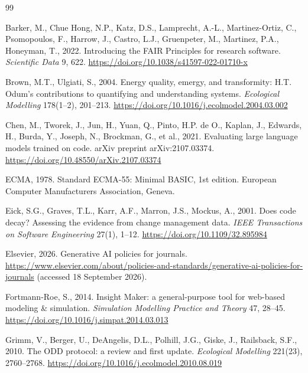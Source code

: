 \documentclass[11pt,a4paper]{article}
\begin{document}
\begin{thebibliography}{99}

Barker, M., Chue Hong, N.P., Katz, D.S., Lamprecht, A.-L., Martinez-Ortiz, C., Psomopoulos, F., Harrow, J., Castro, L.J., Gruenpeter, M., Martinez, P.A., Honeyman, T., 2022. Introducing the FAIR Principles for research software. \emph{Scientific Data} 9, 622. \url{https://doi.org/10.1038/s41597-022-01710-x}

Brown, M.T., Ulgiati, S., 2004. Energy quality, emergy, and transformity: H.T. Odum's contributions to quantifying and understanding systems. \emph{Ecological Modelling} 178(1--2), 201--213. \url{https://doi.org/10.1016/j.ecolmodel.2004.03.002}

Chen, M., Tworek, J., Jun, H., Yuan, Q., Pinto, H.P. de O., Kaplan, J., Edwards, H., Burda, Y., Joseph, N., Brockman, G., et al., 2021. Evaluating large language models trained on code. arXiv preprint arXiv:2107.03374. \url{https://doi.org/10.48550/arXiv.2107.03374}

ECMA, 1978. Standard ECMA-55: Minimal BASIC, 1st edition. European Computer Manufacturers Association, Geneva.

Eick, S.G., Graves, T.L., Karr, A.F., Marron, J.S., Mockus, A., 2001. Does code decay? Assessing the evidence from change management data. \emph{IEEE Transactions on Software Engineering} 27(1), 1--12. \url{https://doi.org/10.1109/32.895984}

Elsevier, 2026. Generative AI policies for journals. \url{https://www.elsevier.com/about/policies-and-standards/generative-ai-policies-for-journals} (accessed 18 September 2026).

Fortmann-Roe, S., 2014. Insight Maker: a general-purpose tool for web-based modeling \& simulation. \emph{Simulation Modelling Practice and Theory} 47, 28--45. \url{https://doi.org/10.1016/j.simpat.2014.03.013}

Grimm, V., Berger, U., DeAngelis, D.L., Polhill, J.G., Giske, J., Railsback, S.F., 2010. The ODD protocol: a review and first update. \emph{Ecological Modelling} 221(23), 2760--2768. \url{https://doi.org/10.1016/j.ecolmodel.2010.08.019}


\end{thebibliography}
\end{document}
